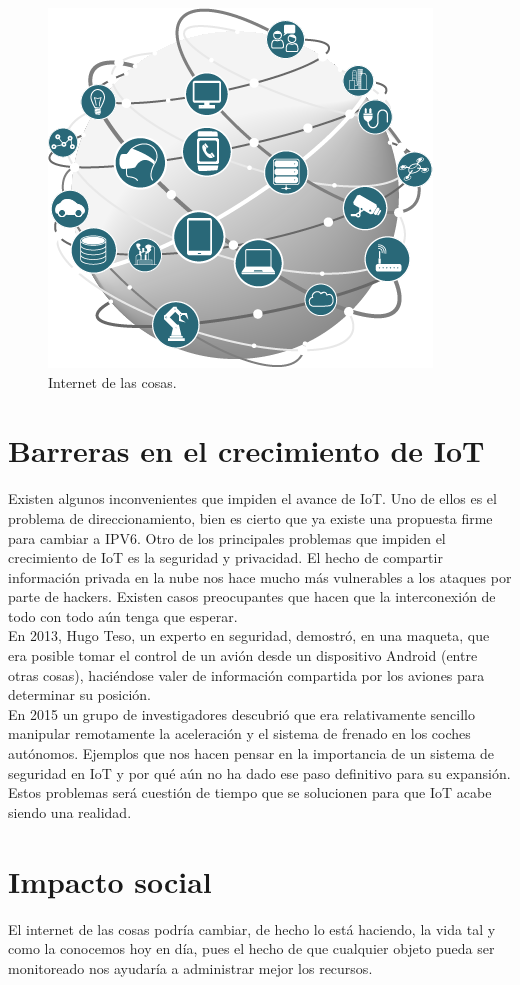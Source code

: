 \documentclass[12pt, twoside]{book}
\begin{document}
\begin{figure}[H]
\centering
\includegraphics[scale=0.4]{images/iot}
\caption{Internet de las cosas.}\label{L105}
\end{figure}
\section{Barreras en el crecimiento de IoT}
Existen algunos inconvenientes que impiden el avance de IoT. Uno de ellos es el problema de direccionamiento, bien es cierto que ya existe una propuesta firme para cambiar a IPV6. Otro de los principales problemas que impiden el crecimiento de IoT es la seguridad y privacidad. El hecho de compartir información privada en la nube nos hace mucho más vulnerables a los ataques por parte de hackers. Existen casos preocupantes que hacen que la interconexión de todo con todo aún tenga que esperar. \\En 2013, Hugo Teso, un experto en seguridad, demostró, en una maqueta, que era posible tomar el control de un avión desde un dispositivo Android (entre otras cosas), haciéndose valer de información compartida por los aviones para determinar su posición. \\En 2015 un grupo de investigadores descubrió que era relativamente sencillo manipular remotamente la aceleración y el sistema de frenado en los coches autónomos. Ejemplos que nos hacen pensar en la importancia de un sistema de seguridad en IoT y por qué aún no ha dado ese paso definitivo para su expansión. Estos problemas será cuestión de tiempo que se solucionen para que IoT acabe siendo una realidad.
\section{Impacto social}
El internet de las cosas podría cambiar, de hecho lo está haciendo, la vida tal y como la conocemos hoy en día, pues el hecho de que cualquier objeto pueda ser monitoreado nos ayudaría a administrar mejor los recursos. 
\end{document}
